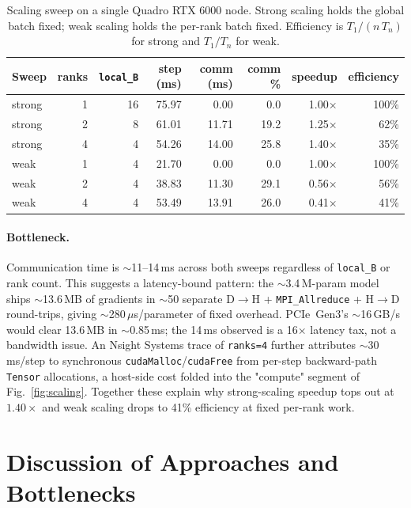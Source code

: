 \documentclass[11pt,letterpaper]{article}
\begin{document}
\begin{table}[!htbp]
  \centering
  \small
  \begin{tabular}{lrrrrrrr}
    \toprule
    Sweep  & ranks & \texttt{local\_B} & step (ms) & comm (ms) & comm \% & speedup & efficiency \\
    \midrule
    strong & 1 & 16 & 75.97 & 0.00  & 0.0  & 1.00$\times$ & 100\% \\
    strong & 2 & 8  & 61.01 & 11.71 & 19.2 & 1.25$\times$ & 62\%  \\
    strong & 4 & 4  & 54.26 & 14.00 & 25.8 & 1.40$\times$ & 35\%  \\
    \midrule
    weak   & 1 & 4 & 21.70 & 0.00  & 0.0  & 1.00$\times$ & 100\% \\
    weak   & 2 & 4 & 38.83 & 11.30 & 29.1 & 0.56$\times$ & 56\%  \\
    weak   & 4 & 4 & 53.49 & 13.91 & 26.0 & 0.41$\times$ & 41\%  \\
    \bottomrule
  \end{tabular}
  \caption{Scaling sweep on a single Quadro RTX 6000 node. Strong scaling holds the global batch fixed; weak scaling holds the per-rank batch fixed. Efficiency is $T_1/(n\,T_n)$ for strong and $T_1/T_n$ for weak.}
  \label{tab:scaling}
\end{table}

\paragraph{Bottleneck.} Communication time is $\sim$11--14\,ms across both sweeps regardless of \texttt{local\_B} or rank count. This suggests a latency-bound pattern: the $\sim$3.4\,M-param model ships $\sim$13.6\,MB of gradients in $\sim$50 separate D$\to$H + \texttt{MPI\_Allreduce} + H$\to$D round-trips, giving $\sim$280\,$\mu$s/parameter of fixed overhead. PCIe~Gen3's $\sim$16\,GB/s would clear 13.6\,MB in $\sim$0.85\,ms; the 14\,ms observed is a 16$\times$ latency tax, not a bandwidth issue. An Nsight Systems trace of \texttt{ranks=4} further attributes $\sim$30\,ms/step to synchronous \texttt{cudaMalloc}/\texttt{cudaFree} from per-step backward-path \texttt{Tensor} allocations, a host-side cost folded into the "compute" segment of Fig.~\ref{fig:scaling}. Together these explain why strong-scaling speedup tops out at $1.40\times$ and weak scaling drops to 41\% efficiency at fixed per-rank work.

\section{Discussion of Approaches and Bottlenecks}
\end{document}
